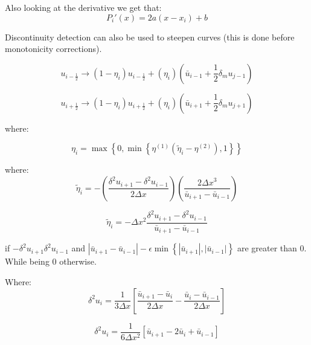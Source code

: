 \documentclass[12pt]{article}
\begin{document}
Also looking at the derivative we get that:
\[P_i'(x) = 2a(x-x_i) + b \]

Discontinuity detection can also be used to steepen curves (this is done before monotonicity corrections).

\[u_{i - \frac{1}{2}} \rightarrow (1 - \eta_i)u_{i - \frac{1}{2}} + (\eta_i)\left(\bar{u}_{i-1} + \frac{1}{2}\delta_m u_{j-1}\right)\]

\[u_{i + \frac{1}{2}} \rightarrow (1 - \eta_i)u_{i + \frac{1}{2}} + (\eta_i)\left(\bar{u}_{i+1} + \frac{1}{2}\delta_m u_{j+1}\right)\]

where:

\[\eta_i = \max \left\lbrace 0, \min \left\lbrace\eta^{(1)} \left(\tilde{\eta}_i - \eta^{(2)}\right) ,1\right\rbrace \right\rbrace\]

where:
\[\tilde{\eta}_i = - \left(\frac{\delta^2u_{i+1} - \delta^2u_{i-1}}{2 \Delta x}\right)\left(\frac{2\Delta x^3}{\bar{u}_{i+1} - \bar{u}_{i-1} }\right)\]

\[\tilde{\eta}_i = - \Delta x^2 \frac{\delta^2u_{i+1} - \delta^2u_{i-1}}{\bar{u}_{i+1} - \bar{u}_{i-1} }\]

if $-\delta^2u_{i+1}\delta^2u_{i-1}$ and $|\bar{u}_{i+1} -\bar{u}_{i-1} | - \epsilon \min \left\lbrace|\bar{u}_{i+1}|,|\bar{u}_{i-1}| \right\rbrace$ are greater than $0$. While being $0$ otherwise.

Where:
\[\delta^2u_{i} = \frac{1}{3 \Delta x} \left[ \frac{\bar{u}_{i+1} - \bar{u}_{i}}{2 \Delta x} - \frac{\bar{u}_{i} - \bar{u}_{i-1}}{2 \Delta x}\right]\]

\[\delta^2u_{i} = \frac{1}{6 \Delta x^2} \left[ \bar{u}_{i + 1} - 2\bar{u}_{i} + \bar{u}_{i - 1} \right]\]
\end{document}

